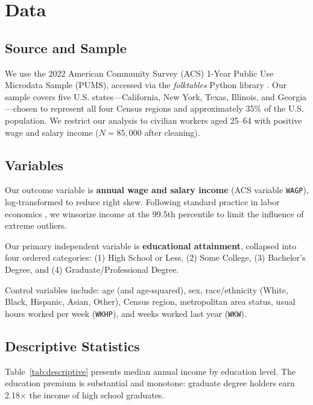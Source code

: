 \documentclass[11pt]{article}
\begin{document}
\section{Data}

\subsection{Source and Sample}

We use the 2022 American Community Survey (ACS) 1-Year Public Use Microdata
Sample (PUMS), accessed via the \textit{folktables} Python library
\citep{ding2021retiring}. Our sample covers five U.S. states---California,
New York, Texas, Illinois, and Georgia---chosen to represent all four Census
regions and approximately 35\% of the U.S. population. We restrict our
analysis to civilian workers aged 25--64 with positive wage and salary income
($N = 85{,}000$ after cleaning).

\subsection{Variables}

Our outcome variable is \textbf{annual wage and salary income} (ACS variable
\texttt{WAGP}), log-transformed to reduce right skew. Following standard
practice in labor economics \citep{lemieux2006increasing}, we winsorize income
at the 99.5th percentile to limit the influence of extreme outliers.

Our primary independent variable is \textbf{educational attainment}, collapsed
into four ordered categories: (1) High School or Less, (2) Some College,
(3) Bachelor's Degree, and (4) Graduate/Professional Degree.

Control variables include: age (and age-squared), sex, race/ethnicity
(White, Black, Hispanic, Asian, Other), Census region, metropolitan area
status, usual hours worked per week (\texttt{WKHP}), and weeks worked last
year (\texttt{WKW}).

\subsection{Descriptive Statistics}

Table~\ref{tab:descriptive} presents median annual income by education level.
The education premium is substantial and monotone: graduate degree holders
earn 2.18$\times$ the income of high school graduates.
\end{document}
